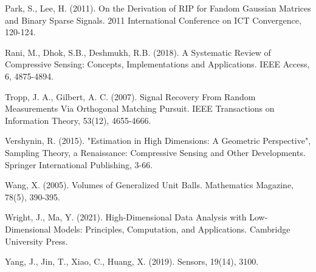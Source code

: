 \documentclass[12pt,a4paper]{amsart}
\numberwithin{equation}{section}
\theoremstyle{plain}
\theoremstyle{definition}
\begin{document}
\begin{thebibliography}{99}
 Park, S., Lee, H. (2011). On the Derivation of RIP for Fandom Gaussian Matrices and Binary Sparse Signals. 2011 International Conference on ICT Convergence, 120-124.

 Rani, M., Dhok, S.B., Deshmukh, R.B. (2018). A Systematic Review of Compressive Sensing: Concepts, Implementations and Applications. IEEE Access, 6, 4875-4894.

 Tropp, J. A., Gilbert, A. C. (2007). Signal Recovery From Random Measurements Via Orthogonal Matching Pursuit. IEEE Transactions on Information Theory, 53(12), 4655-4666.

 Vershynin, R. (2015). "Estimation in High Dimensions: A Geometric Perspective", Sampling Theory, a Renaissance: Compressive Sensing and Other Developments. Springer International Publishing, 3-66.

 Wang, X. (2005). Volumes of Generalized Unit Balls. Mathematics Magazine, 78(5), 390-395.

 Wright, J., Ma, Y. (2021). High-Dimensional Data Analysis with Low-Dimensional Models: Principles, Computation, and Applications. Cambridge University Press.

 Yang, J., Jin, T., Xiao, C., Huang, X. (2019). Sensors, 19(14), 3100.

\end{thebibliography}
\end{document}
